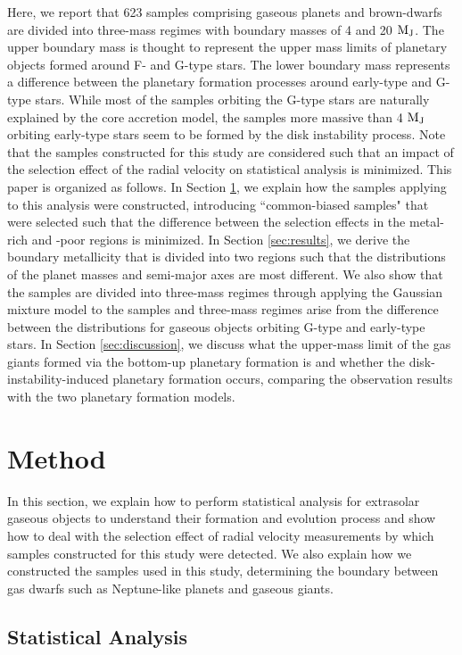 \documentclass[twocolumn, dvipdfmx]{aastex62}
\begin{document}
\begin{CJK*}{UTF8}{min}
Here, we report that 623 samples comprising gaseous planets and brown-dwarfs are divided into three-mass regimes with boundary masses of 4 and 20 $\rm M_J$. The upper boundary mass is thought to represent the upper mass limits of planetary objects formed around F- and G-type stars. The lower boundary mass represents a difference between the planetary formation processes around early-type and G-type stars. While most of the samples orbiting the G-type stars are naturally explained by the core accretion model, the samples more massive than 4 $\rm M_J$ orbiting early-type stars seem to be formed by the disk instability process. Note that the samples constructed for this study are considered such that an impact of the selection effect of the radial velocity on statistical analysis is minimized. This paper is organized as follows. In Section \ref{sec:method}, we explain how the samples applying to this analysis were constructed, introducing ``common-biased samples" that were selected such that the difference between the selection effects in the metal-rich and -poor regions is minimized. In Section \ref{sec:results}, we derive the boundary metallicity that is divided into two regions such that the distributions of the planet masses and semi-major axes are most different. We also show that the samples are divided into three-mass regimes through applying the Gaussian mixture model to the samples and three-mass regimes arise from the difference between the distributions for gaseous objects orbiting G-type and early-type stars. In Section \ref{sec:discussion}, we discuss what the upper-mass limit of the gas giants formed via the bottom-up planetary formation is and whether the disk-instability-induced planetary formation occurs, comparing the observation results with the two planetary formation models.


\section{Method} \label{sec:method}

In this section, we explain how to perform statistical analysis for extrasolar gaseous objects to understand their formation and evolution process and show how to deal with the selection effect of radial velocity measurements by which samples constructed for this study were detected. We also explain how we constructed the samples used in this study, determining the boundary between gas dwarfs such as Neptune-like planets and gaseous giants.


\subsection{Statistical Analysis} \label{subsec:analysis}


\end{CJK*}
\end{document}
